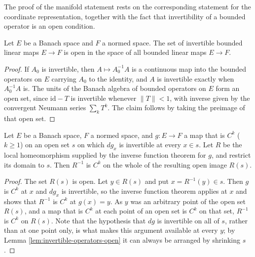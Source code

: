 The proof of the manifold statement rests on the corresponding statement for the coordinate representation, together with the fact that invertibility of a bounded operator is an open condition.

\begin{lemma}
\label{lem:invertible-operators-open}




Let $E$ be a Banach space and $F$ a normed space. The set of invertible bounded linear maps $E \to F$ is open in the space of all bounded linear maps $E \to F$.
\end{lemma}

\begin{proof}

If $A_0$ is invertible, then $A \mapsto A_0^{-1} A$ is a continuous map into the bounded operators on $E$ carrying $A_0$ to the identity, and $A$ is invertible exactly when $A_0^{-1}A$ is. The units of the Banach algebra of bounded operators on $E$ form an open set, since $\mathrm{id} - T$ is invertible whenever $\|T\| < 1$, with inverse given by the convergent Neumann series $\sum_k T^k$. The claim follows by taking the preimage of that open set.
\end{proof}

\begin{lemma}
\label{lem:smooth-local-inverse-on-open}





Let $E$ be a Banach space, $F$ a normed space, and $g : E \to F$ a map that is $C^k$ ($k \geq 1$) on an open set $s$ on which $dg_x$ is invertible at every $x \in s$. Let $R$ be the local homeomorphism supplied by the inverse function theorem for $g$, and restrict its domain to $s$. Then $R^{-1}$ is $C^k$ on the whole of the resulting open image $R(s)$.
\end{lemma}

\begin{proof}

The set $R(s)$ is open. Let $y \in R(s)$ and put $x = R^{-1}(y) \in s$. Then $g$ is $C^k$ at $x$ and $dg_x$ is invertible, so the inverse function theorem applies at $x$ and shows that $R^{-1}$ is $C^k$ at $g(x) = y$. As $y$ was an arbitrary point of the open set $R(s)$, and a map that is $C^k$ at each point of an open set is $C^k$ on that set, $R^{-1}$ is $C^k$ on $R(s)$. Note that the hypothesis that $dg$ is invertible on all of $s$, rather than at one point only, is what makes this argument available at every $y$; by Lemma \ref{lem:invertible-operators-open} it can always be arranged by shrinking $s$.
\end{proof}

